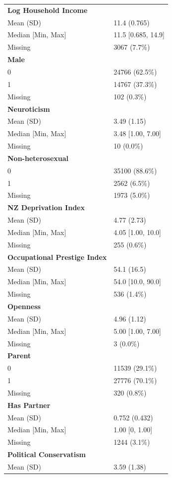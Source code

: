 \documentclass[
  single column]{article}
\begin{document}
\begin{longtable}[]{@{}ll@{}}
\textbf{Log Household Income} & \\
Mean (SD) & 11.4 (0.765) \\
Median {[}Min, Max{]} & 11.5 {[}0.685, 14.9{]} \\
Missing & 3067 (7.7\%) \\
\textbf{Male} & \\
0 & 24766 (62.5\%) \\
1 & 14767 (37.3\%) \\
Missing & 102 (0.3\%) \\
\textbf{Neuroticism} & \\
Mean (SD) & 3.49 (1.15) \\
Median {[}Min, Max{]} & 3.48 {[}1.00, 7.00{]} \\
Missing & 10 (0.0\%) \\
\textbf{Non-heterosexual} & \\
0 & 35100 (88.6\%) \\
1 & 2562 (6.5\%) \\
Missing & 1973 (5.0\%) \\
\textbf{NZ Deprivation Index} & \\
Mean (SD) & 4.77 (2.73) \\
Median {[}Min, Max{]} & 4.05 {[}1.00, 10.0{]} \\
Missing & 255 (0.6\%) \\
\textbf{Occupational Prestige Index} & \\
Mean (SD) & 54.1 (16.5) \\
Median {[}Min, Max{]} & 54.0 {[}10.0, 90.0{]} \\
Missing & 536 (1.4\%) \\
\textbf{Openness} & \\
Mean (SD) & 4.96 (1.12) \\
Median {[}Min, Max{]} & 5.00 {[}1.00, 7.00{]} \\
Missing & 3 (0.0\%) \\
\textbf{Parent} & \\
0 & 11539 (29.1\%) \\
1 & 27776 (70.1\%) \\
Missing & 320 (0.8\%) \\
\textbf{Has Partner} & \\
Mean (SD) & 0.752 (0.432) \\
Median {[}Min, Max{]} & 1.00 {[}0, 1.00{]} \\
Missing & 1244 (3.1\%) \\
\textbf{Political Conservatism} & \\
Mean (SD) & 3.59 (1.38) \\

\end{longtable}
\end{document}

